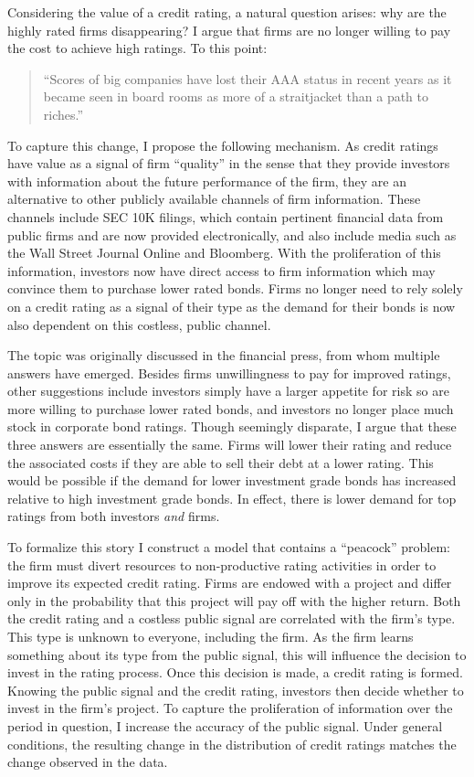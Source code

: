 \documentclass[titlepage]{article}
\begin{document}
Considering the value of a credit rating, a natural question arises: why are the highly rated firms disappearing? I argue that firms are no longer willing to pay the cost to achieve high ratings. To this point:
\begin{quote}
``Scores of big companies have lost their AAA status in recent years as it became seen in board rooms as more of a straitjacket than a path to riches.''
\end{quote}
To capture this change, I propose the following mechanism. As credit ratings have value as a signal of firm ``quality'' in the sense that they provide investors with information about the future performance of the firm, they are an alternative to other publicly available channels of firm information. These channels include SEC 10K filings, which contain pertinent financial data from public firms and are now provided electronically, and also include media such as the Wall Street Journal Online and Bloomberg. With the proliferation of this information, investors now have direct access to firm information which may convince them to purchase lower rated bonds. Firms no longer need to rely solely on a credit rating as a signal of their type as the demand for their bonds is now also dependent on this costless, public channel.

The topic was originally discussed in the financial press, from whom multiple answers have emerged. Besides firms unwillingness to pay for improved ratings, other suggestions include investors simply have a larger appetite for risk so are more willing to purchase lower rated bonds, and investors no longer place much stock in corporate bond ratings. Though seemingly disparate, I argue that these three answers are essentially the same. Firms will lower their rating and reduce the associated costs if they are able to sell their debt at a lower rating. This would be possible if the demand for lower investment grade bonds has increased relative to high investment grade bonds. In effect, there is lower demand for top ratings from both investors \emph{and} firms.

To formalize this story I construct a model that contains a ``peacock'' problem: the firm must divert resources to non-productive rating activities in order to improve its expected credit rating. Firms are endowed with a project and differ only in the probability that this project will pay off with the higher return. Both the credit rating and a costless public signal are correlated with the firm's type. This type is unknown to everyone, including the firm. As the firm learns something about its type from the public signal, this will influence the decision to invest in the rating process. Once this decision is made, a credit rating is formed. Knowing the public signal and the credit rating, investors then decide whether to invest in the firm's project. To capture the proliferation of information over the period in question, I increase the accuracy of the public signal. Under general conditions, the resulting change in the distribution of credit ratings matches the change observed in the data.
\end{document}
